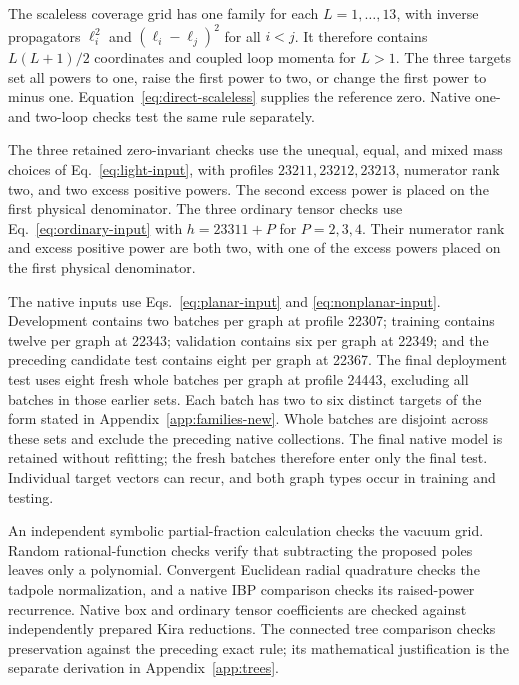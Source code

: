The scaleless coverage grid has one family for each $L=1,\ldots,13$, with inverse propagators $\ell_i^2$ and $(\ell_i-\ell_j)^2$ for all $i<j$. It therefore contains $L(L+1)/2$ coordinates and coupled loop momenta for $L>1$. The three targets set all powers to one, raise the first power to two, or change the first power to minus one. Equation~\eqref{eq:direct-scaleless} supplies the reference zero. Native one- and two-loop checks test the same rule separately.

The three retained zero-invariant checks use the unequal, equal, and mixed mass choices of Eq.~\eqref{eq:light-input}, with profiles $23211,23212,23213$, numerator rank two, and two excess positive powers. The second excess power is placed on the first physical denominator. The three ordinary tensor checks use Eq.~\eqref{eq:ordinary-input} with $h=23311+P$ for $P=2,3,4$. Their numerator rank and excess positive power are both two, with one of the excess powers placed on the first physical denominator.

The native inputs use Eqs.~\eqref{eq:planar-input} and \eqref{eq:nonplanar-input}. Development contains two batches per graph at profile 22307; training contains twelve per graph at 22343; validation contains six per graph at 22349; and the preceding candidate test contains eight per graph at 22367. The final deployment test uses eight fresh whole batches per graph at profile 24443, excluding all batches in those earlier sets. Each batch has two to six distinct targets of the form stated in Appendix~\ref{app:families-new}. Whole batches are disjoint across these sets and exclude the preceding native collections. The final native model is retained without refitting; the fresh batches therefore enter only the final test. Individual target vectors can recur, and both graph types occur in training and testing.

An independent symbolic partial-fraction calculation checks the vacuum grid. Random rational-function checks verify that subtracting the proposed poles leaves only a polynomial. Convergent Euclidean radial quadrature checks the tadpole normalization, and a native IBP comparison checks its raised-power recurrence. Native box and ordinary tensor coefficients are checked against independently prepared Kira reductions. The connected tree comparison checks preservation against the preceding exact rule; its mathematical justification is the separate derivation in Appendix~\ref{app:trees}.
